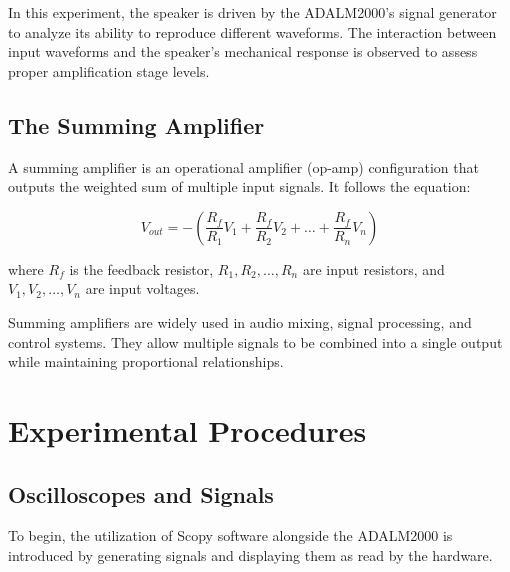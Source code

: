 \documentclass[12pt]{article}
\begin{document}
In this experiment, the speaker is driven by the ADALM2000’s signal generator to
analyze its ability to reproduce different waveforms. The interaction between
input waveforms and the speaker's mechanical response is observed to assess
proper amplification stage levels.

\subsection{The Summing Amplifier}
A summing amplifier is an operational
amplifier (op-amp) configuration that outputs the weighted sum of multiple input
signals. It follows the equation:

\begin{equation} V_{out} = -\left(\frac{R_f}{R_1} V_1 + \frac{R_f}{R_2} V_2 +
	\dots + \frac{R_f}{R_n} V_n\right) \end{equation}

where \( R_f \) is the feedback resistor, \( R_1, R_2, \dots, R_n \) are input
resistors, and \( V_1, V_2, \dots, V_n \) are input voltages.

Summing amplifiers are widely used in audio mixing, signal processing, and
control systems. They allow multiple signals to be combined into a single output
while maintaining proportional relationships.
\section{Experimental Procedures}
\subsection{Oscilloscopes and Signals}
To begin, the utilization of Scopy software alongside the ADALM2000 is
introduced by generating signals and displaying them as read by the hardware.
\end{document}
